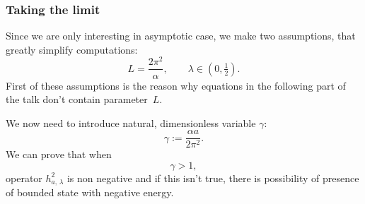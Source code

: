 \documentclass[10pt,t]{beamer}
\begin{document}
\begin{frame}
  \frametitle{Taking the limit}


  Since we are only interesting in asymptotic case, we make two assumptions,
  that greatly simplify computations:
  \begin{equation}
    \label{eq:Rescaled-version-of-the-model-03}
    L = \frac{ 2 \pi^{ 2 } }{ \alpha }, \qquad
    \lambda \in \left( 0, \tfrac{ 1 }{ 2 } \right).
  \end{equation}
  First of these assumptions is the reason why equations in the following
  part of the talk \alert{don't} contain parameter~$L$.

  We now need to introduce natural, dimensionless variable $\gamma$:
  \begin{equation}
    \label{eq:Rescaled-version-of-the-model-04}
    \gamma := \frac{ \alpha a }{ 2 \pi^{ 2 } }.
  \end{equation}
  We can prove that when
  \begin{equation}
    \label{eq:Rescaled-version-of-the-model-05}
    \gamma > 1,
  \end{equation}
  operator $h_{ a, \, \lambda }^{ 2 }$ is non negative and if this isn't true,
  there is \alert{possibility} of presence of bounded state with
  negative energy.




\end{frame}
\end{document}
